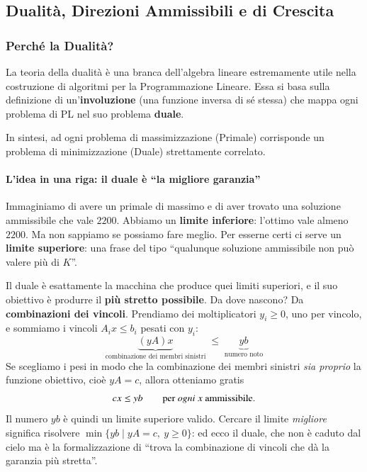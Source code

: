 \documentclass[12pt]{extarticle} %
\begin{document}
\subsection{Dualità, Direzioni Ammissibili e di Crescita}

\subsubsection{Perché la Dualità?}
La teoria della dualità è una branca dell'algebra lineare estremamente utile nella costruzione di algoritmi per la Programmazione Lineare. Essa si basa sulla definizione di un'\textbf{involuzione} (una funzione inversa di sé stessa) che mappa ogni problema di PL nel suo problema \textbf{duale}. 

In sintesi, ad ogni problema di massimizzazione (Primale) corrisponde un problema di minimizzazione (Duale) strettamente correlato.

\paragraph{L'idea in una riga: il duale è ``la migliore garanzia''}
Immaginiamo di avere un primale di massimo e di aver trovato una soluzione ammissibile che vale $2200$. Abbiamo un \textbf{limite inferiore}: l'ottimo vale almeno $2200$. Ma non sappiamo se possiamo fare meglio. Per esserne certi ci serve un \textbf{limite superiore}: una frase del tipo ``qualunque soluzione ammissibile non può valere più di $K$''.

Il duale è esattamente la macchina che produce quei limiti superiori, e il suo obiettivo è produrre il \textbf{più stretto possibile}. Da dove nascono? Da \textbf{combinazioni dei vincoli}. Prendiamo dei moltiplicatori $y_i \ge 0$, uno per vincolo, e sommiamo i vincoli $A_i x \le b_i$ pesati con $y_i$:
\[
\underbrace{(yA)x}_{\text{combinazione dei membri sinistri}} \;\le\; \underbrace{yb}_{\text{numero noto}}
\]
Se scegliamo i pesi in modo che la combinazione dei membri sinistri \emph{sia proprio} la funzione obiettivo, cioè $yA = c$, allora otteniamo gratis
\[
cx \le yb \qquad \text{per \emph{ogni} } x \text{ ammissibile.}
\]
Il numero $yb$ è quindi un limite superiore valido. Cercare il limite \emph{migliore} significa risolvere $\min\{yb \mid yA = c,\ y\ge 0\}$: ed ecco il duale, che non è caduto dal cielo ma è la formalizzazione di ``trova la combinazione di vincoli che dà la garanzia più stretta''.
\end{document}
